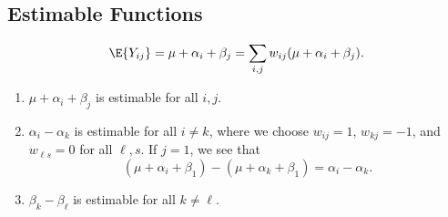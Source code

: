 \subsection*{Estimable Functions}
\[ \E{Y_{ij}}=\mu+\alpha_i+\beta_j =\sum_{i,j}w_{ij}(\mu+\alpha_i+\beta_j). \]
\begin{enumerate}[(1)]
    \item $ \mu+\alpha_i+\beta_j $ is estimable for all $ i,j $.
    \item $ \alpha_i-\alpha_k $ is estimable for all $ i\ne k $,
          where we choose $ w_{ij}=1 $, $ w_{kj}=-1 $, and $ w_{\ell s}=0 $ for all $ \ell,s $.
          If $ j=1 $, we see that
          \[ (\mu+\alpha_i+\beta_1)-(\mu+\alpha_k+\beta_1)=\alpha_i-\alpha_k. \]
    \item $ \beta_k-\beta_\ell $ is estimable for all $ k\ne \ell $.
\end{enumerate}
